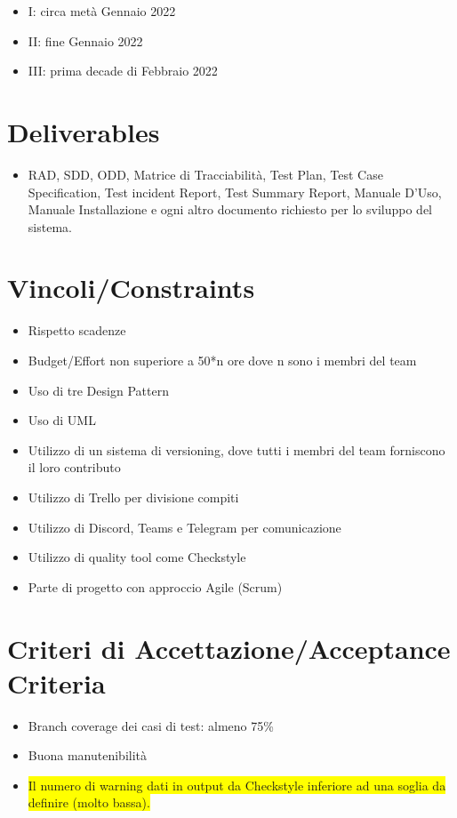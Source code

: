 \documentclass[12pt]{article}
\begin{document}
  \begin{itemize}
      \item I: circa metà Gennaio 2022
      \item II: fine Gennaio 2022
      \item III: prima decade di Febbraio 2022
  \end{itemize}
  
  \section{Deliverables}
  \begin{itemize}
      \item RAD, SDD, ODD, Matrice di Tracciabilità, Test Plan, Test Case Specification, Test incident Report, Test Summary Report, Manuale D’Uso, Manuale Installazione e ogni altro documento richiesto per lo sviluppo del sistema.
  \end{itemize}
  
  \section{Vincoli/Constraints}
  \begin{itemize}
  \item Rispetto scadenze
  \item Budget/Effort non superiore a 50*n ore dove n sono i membri del team 
  \item Uso di tre Design Pattern
  \item Uso di UML
  \item Utilizzo di un sistema di versioning, dove tutti i membri del team forniscono il loro contributo
  \item Utilizzo di Trello per divisione compiti
  \item Utilizzo di Discord, Teams e Telegram per comunicazione
  \item Utilizzo di quality tool come Checkstyle
  \item Parte di progetto con approccio Agile (Scrum)
  \end{itemize}
  
  \section{Criteri di Accettazione/Acceptance Criteria}
  \begin{itemize}
      \item Branch coverage dei casi di test: almeno 75\%
      \item Buona manutenibilità
      \item \colorbox{yellow}{Il numero di warning dati in output da Checkstyle inferiore ad una soglia da definire (molto bassa).}
  \end{itemize}
  
\end{document}
